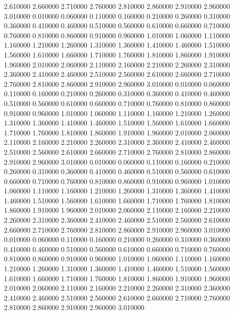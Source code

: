 2.610000
2.660000
2.710000
2.760000
2.810000
2.860000
2.910000
2.960000
3.010000
0.010000
0.060000
0.110000
0.160000
0.210000
0.260000
0.310000
0.360000
0.410000
0.460000
0.510000
0.560000
0.610000
0.660000
0.710000
0.760000
0.810000
0.860000
0.910000
0.960000
1.010000
1.060000
1.110000
1.160000
1.210000
1.260000
1.310000
1.360000
1.410000
1.460000
1.510000
1.560000
1.610000
1.660000
1.710000
1.760000
1.810000
1.860000
1.910000
1.960000
2.010000
2.060000
2.110000
2.160000
2.210000
2.260000
2.310000
2.360000
2.410000
2.460000
2.510000
2.560000
2.610000
2.660000
2.710000
2.760000
2.810000
2.860000
2.910000
2.960000
3.010000
0.010000
0.060000
0.110000
0.160000
0.210000
0.260000
0.310000
0.360000
0.410000
0.460000
0.510000
0.560000
0.610000
0.660000
0.710000
0.760000
0.810000
0.860000
0.910000
0.960000
1.010000
1.060000
1.110000
1.160000
1.210000
1.260000
1.310000
1.360000
1.410000
1.460000
1.510000
1.560000
1.610000
1.660000
1.710000
1.760000
1.810000
1.860000
1.910000
1.960000
2.010000
2.060000
2.110000
2.160000
2.210000
2.260000
2.310000
2.360000
2.410000
2.460000
2.510000
2.560000
2.610000
2.660000
2.710000
2.760000
2.810000
2.860000
2.910000
2.960000
3.010000
0.010000
0.060000
0.110000
0.160000
0.210000
0.260000
0.310000
0.360000
0.410000
0.460000
0.510000
0.560000
0.610000
0.660000
0.710000
0.760000
0.810000
0.860000
0.910000
0.960000
1.010000
1.060000
1.110000
1.160000
1.210000
1.260000
1.310000
1.360000
1.410000
1.460000
1.510000
1.560000
1.610000
1.660000
1.710000
1.760000
1.810000
1.860000
1.910000
1.960000
2.010000
2.060000
2.110000
2.160000
2.210000
2.260000
2.310000
2.360000
2.410000
2.460000
2.510000
2.560000
2.610000
2.660000
2.710000
2.760000
2.810000
2.860000
2.910000
2.960000
3.010000
0.010000
0.060000
0.110000
0.160000
0.210000
0.260000
0.310000
0.360000
0.410000
0.460000
0.510000
0.560000
0.610000
0.660000
0.710000
0.760000
0.810000
0.860000
0.910000
0.960000
1.010000
1.060000
1.110000
1.160000
1.210000
1.260000
1.310000
1.360000
1.410000
1.460000
1.510000
1.560000
1.610000
1.660000
1.710000
1.760000
1.810000
1.860000
1.910000
1.960000
2.010000
2.060000
2.110000
2.160000
2.210000
2.260000
2.310000
2.360000
2.410000
2.460000
2.510000
2.560000
2.610000
2.660000
2.710000
2.760000
2.810000
2.860000
2.910000
2.960000
3.010000
